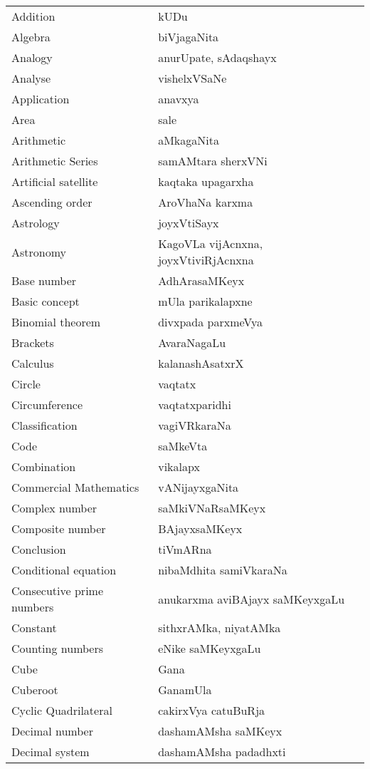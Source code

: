 {\begin{longtable}{>{\rm}l@{\hspace{1cm}}l}
Addition & kUDu\\
Algebra & biVjagaNita\\
Analogy & anurUpate, sAdaqshayx\\
Analyse & vishelxVSaNe\\
Application & anavxya\\
Area & sale\\
Arithmetic & aMkagaNita\\
Arithmetic Series & samAMtara sherxVNi\\
Artificial satellite & kaqtaka upagarxha\\
Ascending order & AroVhaNa karxma\\
Astrology & joyxVtiSayx\\
Astronomy & KagoVLa vijAcnxna, joyxVtiviRjAcnxna\\
Base number & AdhArasaMKeyx\\
Basic concept & mUla parikalapxne\\
Binomial theorem & divxpada parxmeVya\\
Brackets &  AvaraNagaLu\\
Calculus & kalanashAsatxrX\\
Circle & vaqtatx\\
Circumference & vaqtatxparidhi\\
Classification & vagiVRkaraNa\\
Code & saMkeVta\\
Combination & vikalapx\\
Commercial Mathematics & vANijayxgaNita\\
Complex number & saMkiVNaRsaMKeyx\\
Composite number & BAjayxsaMKeyx\\
Conclusion & tiVmARna\\
Conditional equation & nibaMdhita samiVkaraNa\\
Consecutive prime numbers & anukarxma aviBAjayx saMKeyxgaLu\\
Constant & sithxrAMka, niyatAMka\\
Counting numbers & eNike saMKeyxgaLu\\
Cube & Gana\\
Cuberoot & GanamUla\\
Cyclic Quadrilateral & cakirxVya catuBuRja\\
Decimal number & dashamAMsha saMKeyx\\
Decimal system & dashamAMsha padadhxti\\

\end{longtable}}
